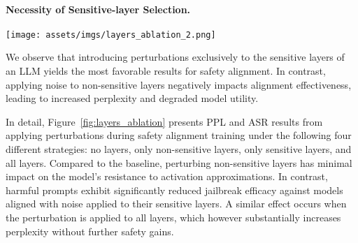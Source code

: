 \paragraph{Necessity of Sensitive-layer Selection.}
\begin{figure*}[!t]
    \centering
    \texttt{[image: assets/imgs/layers\_ablation\_2.png]}
    \caption{Model perplexity scores (PPL) and attack success rates (ASR) for applying perturbations to different types of layers during activation approximation-robust safety alignment.}
    \label{fig:layers_ablation}
\end{figure*}
We observe that introducing perturbations exclusively to the sensitive layers of an LLM yields the most favorable results for safety alignment. In contrast, applying noise to non-sensitive layers negatively impacts alignment effectiveness, leading to increased perplexity and degraded model utility. 

In detail, Figure~\ref{fig:layers_ablation} presents PPL and ASR results from applying perturbations during safety alignment training under the following four different strategies: no layers, only non-sensitive layers, only sensitive layers, and all layers. Compared to the baseline, perturbing non-sensitive layers has minimal impact on the model's resistance to activation approximations. In contrast, harmful prompts exhibit significantly reduced jailbreak efficacy against models aligned with noise applied to their sensitive layers. A similar effect occurs when the perturbation is applied to all layers, which however substantially increases perplexity without further safety gains.


